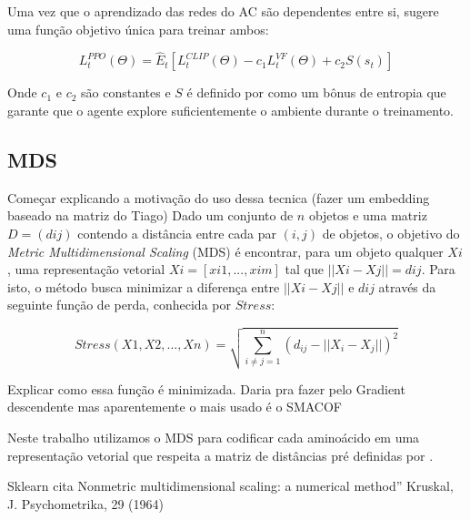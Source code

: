 Uma vez que o aprendizado das redes do AC são dependentes entre si, \cite{PPO} sugere uma função objetivo única para treinar ambos:

\begin{equation}
   L_t ^{PPO} (\Theta) = \hat{E}_t[L_t ^{CLIP} (\Theta) - c_1 L_t ^{VF} (\Theta) + c_2 S(s_t)]
\end{equation}

Onde $c_1$ e $c_2$ são constantes e $S$ é definido por \cite{PPO} como um bônus de entropia que garante que o agente explore suficientemente o ambiente durante o treinamento.

\subsection{MDS}
\label{subsection:MDS}
{\color{red} Começar explicando a motivação do uso dessa tecnica (fazer um embedding baseado na matriz do Tiago)}
Dado um conjunto de $n$ objetos e uma matriz $D = (dij)$ contendo a distância entre cada par $(i,j)$ de objetos, o objetivo do \textit{Metric Multidimensional Scaling} (MDS) é encontrar, 
para um objeto qualquer $Xi$, uma representação vetorial $Xi = [xi1,...,xim]$ tal que $||Xi - Xj|| = dij$.
Para isto, o método busca minimizar a diferença entre $||Xi - Xj||$ e $dij$ através da seguinte função de perda, conhecida por $Stress$:

\begin{equation}
    Stress(X1, X2, ..., Xn) = \sqrt{\sum_{i \neq j = 1}^{n} (d_{ij} - ||X_i - X_j||)^2}
 \end{equation}

{\color{red} Explicar como essa função é minimizada. Daria pra fazer pelo Gradient descendente mas aparentemente o mais usado é o SMACOF}

Neste trabalho utilizamos o MDS para codificar cada aminoácido em uma representação vetorial
que respeita a matriz de distâncias pré definidas por \cite{aminodist}. 

{\color{red} Sklearn cita Nonmetric multidimensional scaling: a numerical method” Kruskal, J. Psychometrika, 29 (1964)}














